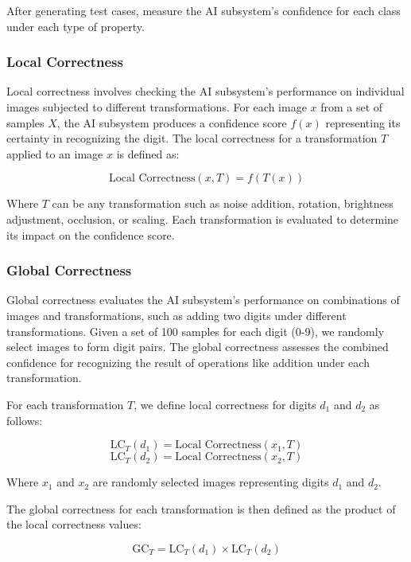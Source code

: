 \documentclass[10pt, conference, a4paper, final]{IEEEtran}
\begin{document}
 After generating test cases, measure the  AI subsystem's confidence for each class under each type of property.
     

  
    \subsubsection{Local Correctness}

    Local correctness involves checking the AI subsystem's performance on individual images subjected to different transformations. For each image \( x \) from a set of samples \( X \), the AI subsystem produces a confidence score \( f(x) \) representing its certainty in recognizing the digit. The local correctness for a transformation \( T \) applied to an image \( x \) is defined as:

    \[
        \text{Local Correctness}(x, T) = f(T(x))
    \]

    Where \( T \) can be any transformation such as noise addition, rotation, brightness adjustment, occlusion, or scaling. Each transformation is evaluated to determine its impact on the confidence score.

    
    \subsubsection{Global Correctness}

    Global correctness evaluates the AI subsystem's performance on combinations of images and transformations, such as adding two digits under different transformations. Given a set of 100 samples for each digit (0-9), we randomly select images to form digit pairs. The global correctness assesses the combined confidence for recognizing the result of operations like addition under each transformation.

    For each transformation \( T \), we define local correctness for digits \( d_1 \) and \( d_2 \) as follows:
    
    \[
    \text{LC}_{T}(d_1) = \text{Local Correctness}(x_1, T)
    \]
    \[
    \text{LC}_{T}(d_2) = \text{Local Correctness}(x_2, T)
    \]
    
    Where \( x_1 \) and \( x_2 \) are randomly selected images representing digits \( d_1 \) and \( d_2 \).
    
    The global correctness for each transformation is then defined as the product of the local correctness values:
    
    \[
    \text{GC}_{T} = \text{LC}_{T}(d_1) \times \text{LC}_{T}(d_2)
    \]
    
\end{document}
